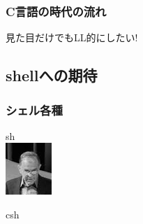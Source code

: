 \documentclass[cjk,dvipdfmx,14pt]{beamer}
\begin{document}
\begin{frame}
\frametitle{C言語の時代の流れ}
 見た目だけでもLL的にしたい!
\end{frame}

\subsection{shellへの期待}


\begin{frame}
\frametitle{シェル各種}
\begin{minipage}[t]{0.3\hsize}
   sh\\
   \includegraphics[width=1\hsize]{image200609/bourne.png}
\end{minipage}
\begin{minipage}[t]{0.3\hsize}
   csh\\

\end{minipage}
\end{frame}
\end{document}
